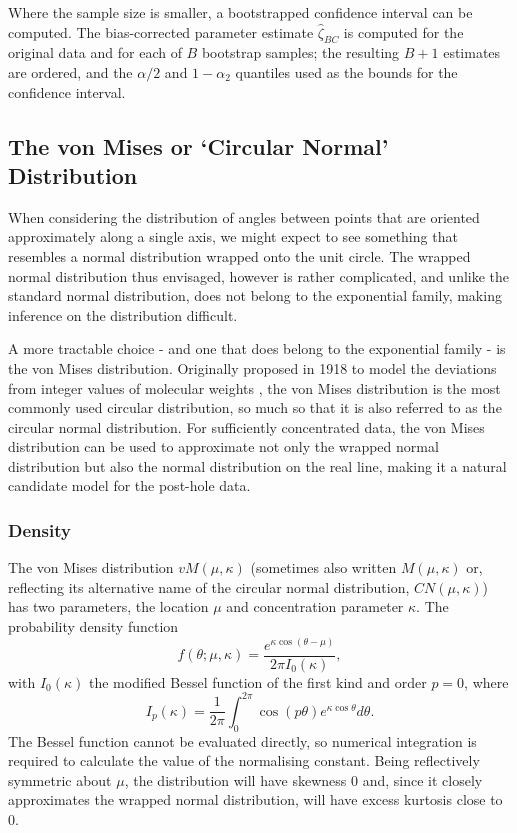 \documentclass[../../ArchStats.tex]{subfiles}
\begin{document}
Where the sample size is smaller, a bootstrapped confidence interval can be computed. The bias-corrected parameter estimate $\hat{\zeta}_{BC}$ is computed for the original data and for each of $B$ bootstrap samples; the resulting $B+1$ estimates are ordered, and the $\alpha/2$ and $1- \alpha_2$ quantiles used as the bounds for the confidence interval.



\subsection{The von Mises or `Circular Normal' Distribution}
\label{sec:vonMises}

When considering the distribution of angles between points that are oriented approximately along a single axis, we might expect to see something that resembles a normal distribution wrapped onto the unit circle. The wrapped normal distribution thus envisaged, however is rather complicated, and unlike the standard normal distribution, does not belong to the exponential family, making inference on the distribution difficult.

A more tractable choice - and one that does belong to the exponential family - is the von Mises distribution. Originally proposed in 1918 to model the deviations from integer values of molecular weights \cite{VonMises1918}, the von Mises distribution is the most commonly used circular distribution, so much so that it is also referred to as the circular normal distribution. For sufficiently concentrated data, the von Mises distribution can be used to approximate not only the wrapped normal distribution but also the normal distribution on the real line, making it a natural candidate model for the post-hole data.

\subsubsection{Density}
The von Mises distribution $vM(\mu, \kappa)$ (sometimes also written $M(\mu, \kappa)$ or, reflecting its alternative name of the circular normal distribution, $CN(\mu, \kappa)$) has two parameters, the location $\mu$ and concentration parameter $\kappa$. The probability density function 
	\begin{equation}
	f(\theta; \mu, \kappa) = \frac{e^{\kappa \cos(\theta - \mu)}}{2\pi I_0(\kappa)},	
	\end{equation}
with $I_0(\kappa)$ the modified Bessel function of the first kind and order $p=0$, where
	\begin{equation}
	\label{eq:mod-Bessel}
	I_p(\kappa) = \frac{1}{2\pi}\int_0^{2\pi} \cos(p\theta)e^{\kappa \cos \theta} d\theta.
	\end{equation}
The Bessel function cannot be evaluated directly, so numerical integration is required to calculate the value of the normalising constant. Being reflectively symmetric about $\mu$, the distribution will have skewness 0 and, since it closely approximates the wrapped normal distribution, will have excess kurtosis close to 0. 
\end{document}
